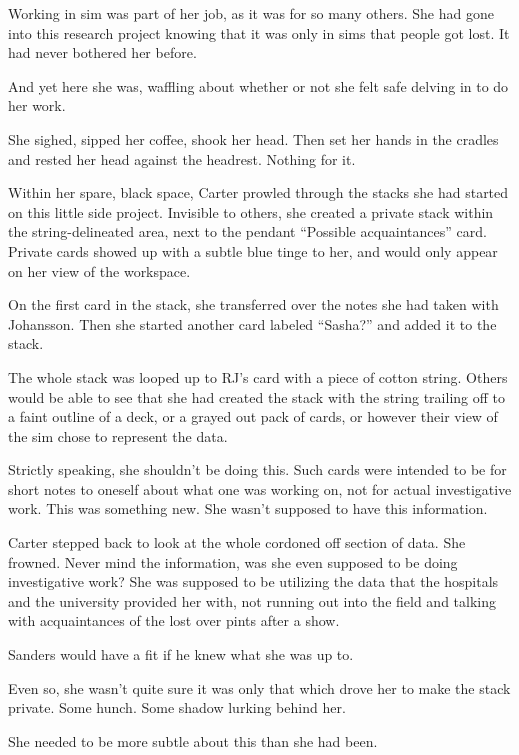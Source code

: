 Working in sim was part of her job, as it was for so many others. She had gone into this research project knowing that it was only in sims that people got lost. It had never bothered her before.

And yet here she was, waffling about whether or not she felt safe delving in to do her work.

She sighed, sipped her coffee, shook her head. Then set her hands in the cradles and rested her head against the headrest. Nothing for it.

Within her spare, black space, Carter prowled through the stacks she had started on this little side project. Invisible to others, she created a private stack within the string-delineated area, next to the pendant ``Possible acquaintances'' card. Private cards showed up with a subtle blue tinge to her, and would only appear on her view of the workspace.

On the first card in the stack, she transferred over the notes she had taken with Johansson. Then she started another card labeled ``Sasha?'' and added it to the stack.

The whole stack was looped up to RJ's card with a piece of cotton string. Others would be able to see that she had created the stack with the string trailing off to a faint outline of a deck, or a grayed out pack of cards, or however their view of the sim chose to represent the data.

Strictly speaking, she shouldn't be doing this. Such cards were intended to be for short notes to oneself about what one was working on, not for actual investigative work. This was something new. She wasn't supposed to have this information.

Carter stepped back to look at the whole cordoned off section of data. She frowned. Never mind the information, was she even supposed to be doing investigative work? She was supposed to be utilizing the data that the hospitals and the university provided her with, not running out into the field and talking with acquaintances of the lost over pints after a show.

Sanders would have a fit if he knew what she was up to.

Even so, she wasn't quite sure it was only that which drove her to make the stack private. Some hunch. Some shadow lurking behind her.

She needed to be more subtle about this than she had been.
